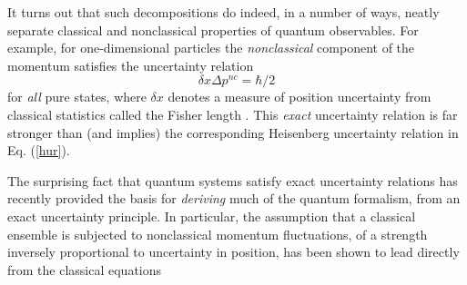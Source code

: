 \documentclass[a4paper,preprint, showpacs, aps, draft]{revtex4}
\begin{document}
It turns out that
such decompositions do indeed, in a number of ways, 
neatly separate classical and
nonclassical properties of quantum observables.  
For example, for one-dimensional particles the {\it
nonclassical} component of the momentum satisfies the uncertainty
relation 
\begin{equation} \label{eur}
\delta x \Delta p^{nc} = \hbar/2
\end{equation}
for {\it all} pure states, where $\delta x$ denotes 
a measure of position uncertainty from
classical statistics called the Fisher length \cite{eur, hallfish}.
This {\it exact} uncertainty relation is far stronger than
(and implies) the corresponding Heisenberg uncertainty relation in Eq.
(\ref{hur}). 

The surprising fact that quantum systems satisfy exact uncertainty
relations has recently provided the basis for {\it deriving} much of the quantum
formalism, from an exact uncertainty principle.  In particular, the
assumption that a classical ensemble is subjected to nonclassical momentum
fluctuations, of a strength inversely proportional to uncertainty in
position, has been shown to lead directly from the classical equations
\end{document}

